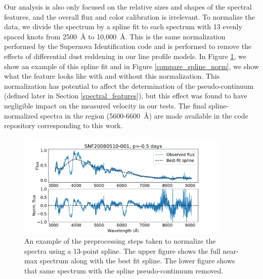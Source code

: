 Our analysis is also only focused on the relative sizes and shapes of the spectral features, and the overall flux and color calibration is irrelevant. To normalize the data, we divide the spectrum by a spline fit to each spectrum with 13 evenly spaced knots from 2500~\AA{} to 10,000~\AA{}. This is the same normalization performed by the Supernova Identification code \citep[SNID,][]{blondin_determining_2007} and is performed to remove the effects of differential dust reddening in our line profile models. In Figure \ref{spline_norm_ex}, we show an example of this spline fit and in Figure \ref{compare_spline_norm}, we show what the \siliconii{} feature looks like with and without this normalization. This normalization has potential to affect the determination of the pseudo-continuum (defined later in Section \ref{spectral_features}), but this effect was found to have negligible impact on the measured velocity in our tests. The final spline-normalized spectra in the \siliconii{} region (5600-6600~\AA{}) are made available in the code repository corresponding to this work.

\begin{figure}[htbp]
    \centering
    \includegraphics[width=0.9\textwidth]{figures/si_feat_pca/spline_norm_ex.pdf}
    \caption{An example of the preprocessing steps taken to normalize the spectra using a 13-point spline. The upper figure shows the full near-max spectrum along with the best fit spline. The lower figure shows that same spectrum with the spline pseudo-continuum removed.}
    \label{spline_norm_ex}
\end{figure}


